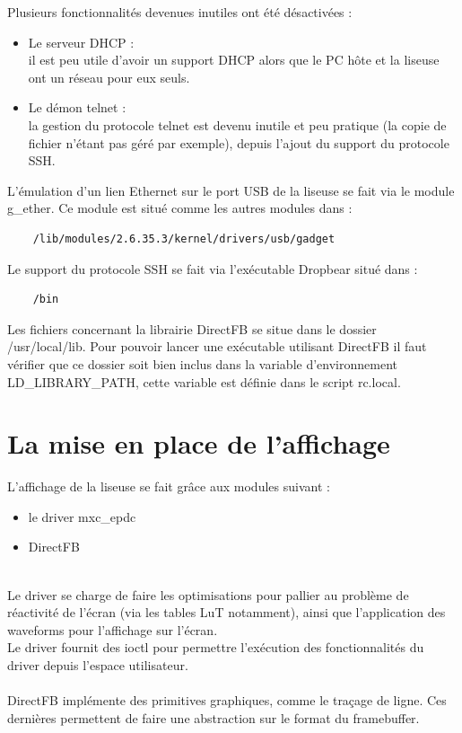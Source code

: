 Plusieurs fonctionnalités devenues inutiles ont été désactivées :
\begin{itemize}
	\item Le serveur DHCP : \\
		il est peu utile d'avoir un support DHCP alors que le PC hôte et la liseuse 
		ont un réseau pour eux seuls.
	\item Le démon telnet : \\
		la gestion du protocole telnet est devenu inutile et peu pratique (la copie de fichier
		 n'étant pas géré par exemple), depuis l'ajout du support du protocole SSH.
\end{itemize}

L'émulation d'un lien Ethernet sur le port USB de la liseuse se fait via le module g_ether.
Ce module est situé comme les autres modules dans :
	\begin{lstlisting}
	/lib/modules/2.6.35.3/kernel/drivers/usb/gadget
	\end{lstlisting}

Le support du protocole SSH se fait via l'exécutable Dropbear situé dans : 
	\begin{lstlisting}
	/bin
	\end{lstlisting}

Les fichiers concernant la librairie DirectFB se situe dans le dossier /usr/local/lib.
Pour pouvoir lancer une exécutable utilisant DirectFB il faut vérifier que ce dossier soit bien inclus dans la variable d'environnement LD_LIBRARY_PATH, cette variable est définie dans le script rc.local.
\section{La mise en place de l'affichage}

L'affichage de la liseuse se fait grâce aux modules suivant : 
\begin{itemize}
	\item le driver mxc_epdc
	\item DirectFB
\end{itemize}~\\

Le driver se charge de faire les optimisations pour pallier au problème de réactivité de l'écran (via les tables LuT notamment), ainsi que l'application des waveforms pour l'affichage sur l'écran.\\
Le driver fournit des ioctl pour permettre l'exécution des fonctionnalités du driver depuis l'espace utilisateur.~\\~\\
DirectFB implémente des primitives graphiques, comme le traçage de ligne. Ces dernières permettent de faire une abstraction sur le format du framebuffer.

